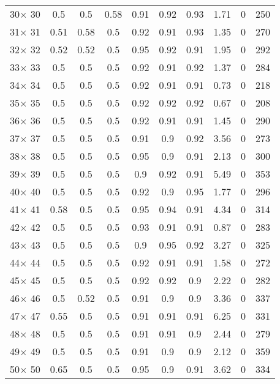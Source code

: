 \documentclass[main.tex]{subfiles}
\begin{document}
\begin{table}
\begin{tabular}{|c|c|c|c|c|c|c|c|c|c|}
30$\times$ 30 &0.5 &0.5 &0.58 &0.91 &0.92 &0.93 &1.71 &0 &250\\
31$\times$ 31 &0.51 &0.58 &0.5 &0.92 &0.91 &0.93 &1.35 &0 &270\\
32$\times$ 32 &0.52 &0.52 &0.5 &0.95 &0.92 &0.91 &1.95 &0 &292\\
33$\times$ 33 &0.5 &0.5 &0.5 &0.92 &0.91 &0.92 &1.37 &0 &284\\
34$\times$ 34 &0.5 &0.5 &0.5 &0.92 &0.91 &0.91 &0.73 &0 &218\\
35$\times$ 35 &0.5 &0.5 &0.5 &0.92 &0.92 &0.92 &0.67 &0 &208\\
36$\times$ 36 &0.5 &0.5 &0.5 &0.92 &0.91 &0.91 &1.45 &0 &290\\
37$\times$ 37 &0.5 &0.5 &0.5 &0.91 &0.9 &0.92 &3.56 &0 &273\\
38$\times$ 38 &0.5 &0.5 &0.5 &0.95 &0.9 &0.91 &2.13 &0 &300\\
39$\times$ 39 &0.5 &0.5 &0.5 &0.9 &0.92 &0.91 &5.49 &0 &353\\
40$\times$ 40 &0.5 &0.5 &0.5 &0.92 &0.9 &0.95 &1.77 &0 &296\\
41$\times$ 41 &0.58 &0.5 &0.5 &0.95 &0.94 &0.91 &4.34 &0 &314\\
42$\times$ 42 &0.5 &0.5 &0.5 &0.93 &0.91 &0.91 &0.87 &0 &283\\
43$\times$ 43 &0.5 &0.5 &0.5 &0.9 &0.95 &0.92 &3.27 &0 &325\\
44$\times$ 44 &0.5 &0.5 &0.5 &0.92 &0.91 &0.91 &1.58 &0 &272\\
45$\times$ 45 &0.5 &0.5 &0.5 &0.92 &0.92 &0.9 &2.22 &0 &282\\
46$\times$ 46 &0.5 &0.52 &0.5 &0.91 &0.9 &0.9 &3.36 &0 &337\\
47$\times$ 47 &0.55 &0.5 &0.5 &0.91 &0.91 &0.91 &6.25 &0 &331\\
48$\times$ 48 &0.5 &0.5 &0.5 &0.91 &0.91 &0.9 &2.44 &0 &279\\
49$\times$ 49 &0.5 &0.5 &0.5 &0.91 &0.9 &0.9 &2.12 &0 &359\\
50$\times$ 50 &0.65 &0.5 &0.5 &0.95 &0.9 &0.91 &3.62 &0 &334\\
    \hline
    \end{tabular}
\end{table}
\end{document}
